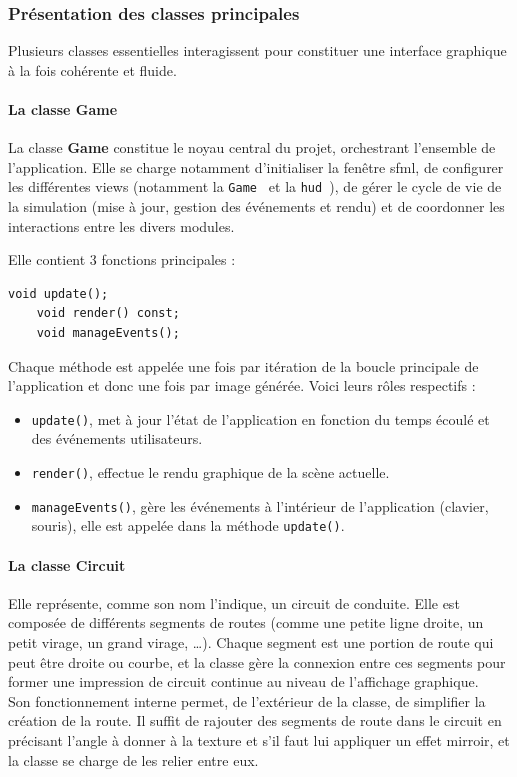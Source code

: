 \subsubsection{Présentation des classes principales}\label{subsubsec:presentation-des-classes-principales}
Plusieurs classes essentielles interagissent pour constituer une interface graphique à la fois cohérente et fluide.

\paragraph[Game]{La classe \textbf{Game}}\label{par:class_game}
La classe \textbf{Game} constitue le noyau central du projet, orchestrant l'ensemble de l'application.
Elle se charge notamment d'initialiser la fenêtre \gls{sfml}, de configurer les différentes \glspl{view} (notamment la \texttt{Game } et la \texttt{\gls{hud} }), de gérer le cycle de vie de la simulation (mise à jour, gestion des événements et rendu) et de coordonner les interactions entre les divers modules.

Elle contient 3 fonctions principales :
\begin{lstlisting}[style=CStyle, label={lst:game_class}]
    void update();
    void render() const;
    void manageEvents();
\end{lstlisting}
Chaque méthode est appelée une fois par itération de la boucle principale de l'application et donc une fois par image générée.
Voici leurs rôles respectifs :
\begin{itemize}
    \item \texttt{update()}, met à jour l'état de l'application en fonction du temps écoulé et des événements utilisateurs.
    \item \texttt{render()}, effectue le rendu graphique de la scène actuelle.
    \item \texttt{manageEvents()}, gère les événements à l'intérieur de l'application (clavier, souris), elle est appelée dans la méthode \texttt{update()}.
\end{itemize}

\paragraph[Circuit]{La classe \textbf{Circuit}}
Elle représente, comme son nom l'indique, un circuit de conduite.
Elle est composée de différents segments de routes (comme une petite ligne droite, un petit virage, un grand virage, \dots).
Chaque segment est une portion de route qui peut être droite ou courbe, et la classe gère la connexion entre ces segments pour former une impression de circuit continue au niveau de l'affichage graphique. \\
Son fonctionnement interne permet, de l'extérieur de la classe, de simplifier la création de la route.
Il suffit de rajouter des segments de route dans le circuit en précisant l'angle à donner à la texture et s'il faut lui appliquer un effet mirroir, et la classe se charge de les relier entre eux.

